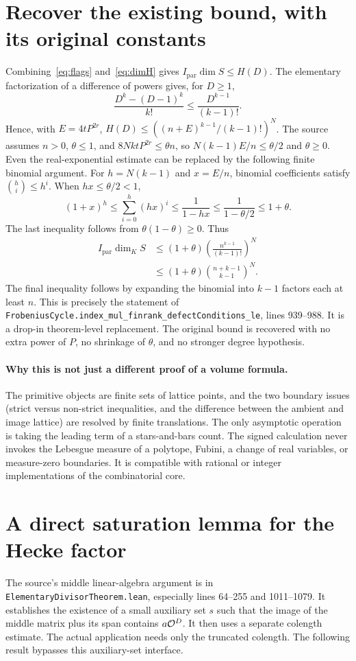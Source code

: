 \documentclass[11pt]{article}
\theoremstyle{remark}\newtheorem{remark}[theorem]{Remark}
\newcommand{\code}[1]{\texttt{#1}}
\begin{document}
\section{Recover the existing bound, with its original constants}\label{sec:recover}
Combining~\eqref{eq:flags} and~\eqref{eq:dimH} gives $I_{\mathrm{par}}\dim S\leq H(D)$. The elementary factorization of a difference of powers gives, for $D\geq1$,
\[
 \frac{D^k-(D-1)^k}{k!}\leq\frac{D^{k-1}}{(k-1)!}.
\]
Hence, with $E=4tP^{2r}$, $H(D)\leq((n+E)^{k-1}/(k-1)!)^N$. The source assumes $n>0$, $\theta\leq1$, and $8NktP^{2r}\leq\theta n$, so $N(k-1) E/n\leq\theta/2$ and $\theta\geq0$. Even the real-exponential estimate can be replaced by the following finite binomial argument. For $h=N(k-1)$ and $x=E/n$, binomial coefficients satisfy $\binom{h}{i}\leq h^i$. When $hx\leq\theta/2<1$,
\[
 (1+x)^h\leq\sum_{i=0}^{h}(hx)^i\leq\frac{1}{1-hx}
 \leq\frac{1}{1-\theta/2}\leq1+\theta.
\]
The last inequality follows from $\theta(1-\theta)\geq0$. Thus
\begin{align*}
 I_{\mathrm{par}}\dim_K S
 &\leq (1+\theta)\left(\frac{n^{k-1}}{(k-1)!}\right)^N\\
 &\leq (1+\theta)\binom{n+k-1}{k-1}^{N}.
\end{align*}
The final inequality follows by expanding the binomial into $k-1$ factors each at least $n$. This is precisely the statement of \code{FrobeniusCycle.index\_mul\_finrank\_defectConditions\_le}, lines 939--988. It is a drop-in theorem-level replacement. The original bound is recovered with no extra power of $P$, no shrinkage of $\theta$, and no stronger degree hypothesis.

\paragraph{Why this is not just a different proof of a volume formula.} The primitive objects are finite sets of lattice points, and the two boundary issues (strict versus non-strict inequalities, and the difference between the ambient and image lattice) are resolved by finite translations. The only asymptotic operation is taking the leading term of a stars-and-bars count. The signed calculation never invokes the Lebesgue measure of a polytope, Fubini, a change of real variables, or measure-zero boundaries. It is compatible with rational or integer implementations of the combinatorial core.

\section{A direct saturation lemma for the Hecke factor}\label{sec:saturation}
The source's middle linear-algebra argument is in \code{ElementaryDivisorTheorem.lean}, especially lines 64--255 and 1011--1079. It establishes the existence of a small auxiliary set $s$ such that the image of the middle matrix plus its span contains $a\mathcal O^D$. It then uses a separate colength estimate. The actual application needs only the truncated colength. The following result bypasses this auxiliary-set interface.
\end{document}
